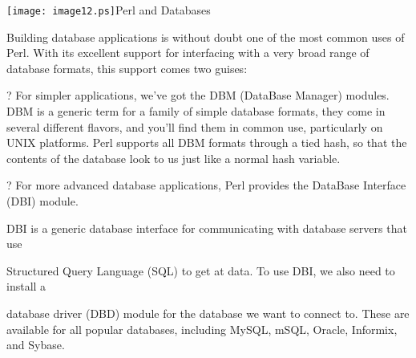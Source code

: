 \documentclass[a4paper,11pt]{book}
\begin{document}

\noindent 

\noindent 

\noindent 

\noindent 

\noindent 

\noindent 

\noindent 

\noindent 

\noindent 

\noindent 

\noindent 

\noindent 

\noindent 

\noindent 

\noindent 

\noindent \texttt{[image: image12.ps]}Perl and Databases

\noindent 

\noindent 

\noindent 

\noindent 

\noindent Building  database applications  is  without  doubt  one  of  the  most  common  uses  of  Perl. With its excellent  support  for interfacing  with  a  very  broad  range  of database  formats,  this  support  comes two guises:

\noindent 

\noindent ? For simpler applications, we've got the DBM (DataBase Manager) modules. DBM is a generic term for a family of simple database formats, they come in several different flavors, and you'll find them in common use, particularly on UNIX platforms. Perl supports all DBM formats through a tied hash, so that the contents of the database look to us just like a normal hash variable.

\noindent 

\noindent ? For more advanced database applications, Perl provides the DataBase Interface (DBI) module.

\noindent DBI is a generic database interface for communicating with database servers that use

\noindent Structured Query Language (SQL) to get at data. To use DBI, we also need to install a

\noindent database driver (DBD) module for the database we want to connect to. These are available for all popular databases, including MySQL, mSQL, Oracle, Informix, and Sybase.
\end{document}
